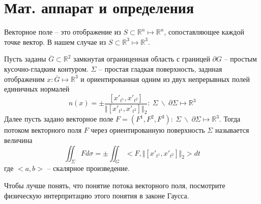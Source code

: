 \section{Мат. аппарат и определения}


\begin{definition}
    Векторное поле -- это отображение из $S \subset \mathbb{R}^n \mapsto \mathbb{R}^n$, сопоставляющее каждой точке вектор. В нашем случае из $S \subset \mathbb{R}^3 \mapsto \mathbb{R}^3$.
\end{definition}

\begin{definition}
    Пусть заданы $\overline{G} \subset \mathbb{R}^2$ замкнутая ограниценная область с границей $\partial G$ -- простым кусочно-гладким контуром. $\Sigma$ -- простая гладкая поверхность, заднная отображеним $x: \overline{G} \mapsto \mathbb{R}^3$ и ориентированная одним из двух непрерывных полей единичных нормалей $$n(x) = \pm \frac{[x'_{t^1}, x'_{t^2}]}{\Vert[x'_{t^1}, x'_{t^2}] \Vert_2}:\ \Sigma\ \backslash\ \partial \Sigma \mapsto \mathbb{R}^3$$ 
    Далее пусть задано векторное поле $F = (F^1, F^2, F^3): \ \Sigma\ \backslash\ \partial \Sigma \mapsto \mathbb{R}^3$. Тогда потоком векторного поля $F$ через ориентированную поверхность $\Sigma$ называется величина $$\iint_\Sigma F d\sigma = \pm \iint_G <F, \Vert[x'_{t^1}, x'_{t^2}] \Vert_2>dt$$
    где $<a, b>$ -- скалярное произведение.
\end{definition}

\begin{remark}
    Чтобы лучше понять, что понятие потока векторного поля, посмотрите физическую интерпритацию этого понятия в законе Гаусса.
\end{remark}

